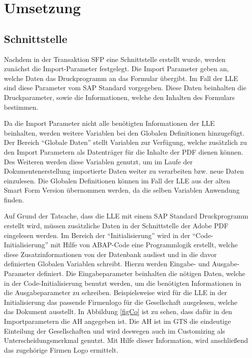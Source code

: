 \chapter{Umsetzung}



 

\section{Schnittstelle}

Nachdem in der Transaktion SFP eine Schnittstelle erstellt wurde, werden zunächst die Import-Parameter festgelegt. Die Import Parameter geben an, welche Daten das Druckprogramm an das Formular übergibt. Im Fall der \ac{LLE} sind diese Parameter vom SAP Standard vorgegeben.
Diese Daten beinhalten die Druckparameter, sowie die Informationen, welche den Inhalten des Formulars bestimmen. 

Da die Import Parameter nicht alle benötigten Informationen der \ac{LLE} beinhalten, werden weitere Variablen bei den Globalen Definitionen hinzugefügt. Der Bereich "`Globale Daten"' stellt Variablen zur Verfügung, welche zusätzlich zu den Import Parametern als Datenträger für die Inhalte der \ac{PDF} dienen können. Des Weiteren werden diese Variablen genutzt, um im Laufe der Dokumentenerstellung importierte Daten weiter zu verarbeiten bzw. neue Daten einzulesen.
Die Globalen Definitionen können im Fall der \ac{LLE} aus der alten Smart Form Version übernommen werden, da die selben Variablen Anwendung finden. 

Auf Grund der Tatsache, dass die \ac{LLE} mit einem SAP Standard Druckprogramm erstellt wird, müssen zusätzliche Daten in der Schnittstelle der Adobe \ac{PDF} eingelesen werden. Im Bereich der "`Initialisierung"' wird in der "`Code-Initialisierung"' mit Hilfe von \ac{ABAP}-Code eine Programmlogik erstellt, welche diese Zusatzinformationen von der Datenbank ausliest und in die davor definierten Globalen Variablen schreibt. Hierzu werden Eingabe- und Ausgabe-Parameter definiert. Die Eingabeparameter beinhalten die nötigen Daten, welche in der Code-Initialisierung benutzt werden, um die benötigten Informationen in die Ausgabeparameter zu schreiben. Beispielsweise wird für die \ac{LLE} in der Initialisierung das passende Firmenlogo für die Gesellschaft ausgelesen, welche das Dokument ausstellt. In Abbildung \ref{figCo} ist zu sehen, dass dafür in den Importparametern die \ac{AH} angegeben ist. Die \ac{AH} ist im GTS die eindeutige Einteilung der Gesellschaften und wird deswegen auch im Customizing als Unterscheidungsmerkmal genutzt. Mit Hilfe dieser Information, wird anschließend das zugehörige Firmen Logo ermittelt.

